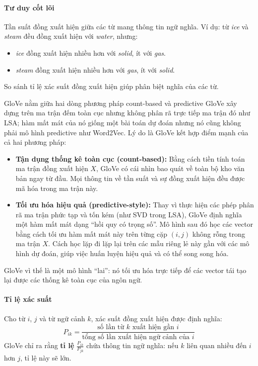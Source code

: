 \paragraph{Tư duy cốt lõi}
Tần suất đồng xuất hiện giữa các từ mang thông tin ngữ nghĩa. Ví dụ: từ \textit{ice} và \textit{steam} đều đồng xuất hiện với \textit{water}, nhưng:
\begin{itemize}
    \item \textit{ice} đồng xuất hiện nhiều hơn với \textit{solid}, ít với \textit{gas}.
    \item \textit{steam} đồng xuất hiện nhiều hơn với \textit{gas}, ít với \textit{solid}.
\end{itemize}
So sánh tỉ lệ xác suất đồng xuất hiện giúp phân biệt nghĩa của các từ.

\begin{assess}{GloVe nằm giữa hai dòng phương pháp count-based và predictive}
GloVe xây dựng trên ma trận đếm toàn cục nhưng không phân rã trực tiếp ma trận đó như LSA; hàm mất mát của nó giống một bài toán dự đoán nhưng nó cũng không phải mô hình predictive như Word2Vec. Lý do là GloVe kết hợp điểm mạnh của cả hai phương pháp:
\begin{itemize}
    \item \textbf{Tận dụng thống kê toàn cục (count-based):} Bằng cách tiền tính toán ma trận đồng xuất hiện $X$, GloVe có cái nhìn bao quát về toàn bộ kho văn bản ngay từ đầu. Mọi thông tin về tần suất và sự đồng xuất hiện đều được mã hóa trong ma trận này.
    \item \textbf{Tối ưu hóa hiệu quả (predictive-style):} Thay vì thực hiện các phép phân rã ma trận phức tạp và tốn kém (như SVD trong LSA), GloVe định nghĩa một hàm mất mát dạng “hồi quy có trọng số”. Mô hình sau đó học các vector bằng cách tối ưu hàm mất mát này trên từng cặp $(i, j)$ không rỗng trong ma trận $X$. Cách học lặp đi lặp lại trên các mẫu riêng lẻ này gần với các mô hình dự đoán, giúp việc huấn luyện hiệu quả và có thể song song hóa.
\end{itemize}
GloVe vì thế là một mô hình “lai”: nó tối ưu hóa trực tiếp để các vector tái tạo lại được các thống kê toàn cục của ngôn ngữ.
\end{assess}

\paragraph{Tỉ lệ xác suất}
Cho từ $i$, $j$ và từ ngữ cảnh $k$, xác suất đồng xuất hiện được định nghĩa:
\[
P_{ik} = \frac{\text{số lần từ $k$ xuất hiện gần $i$}}{\text{tổng số lần xuất hiện ngữ cảnh của $i$}}
\]
GloVe chỉ ra rằng \textbf{tỉ lệ} $\frac{P_{ik}}{P_{jk}}$ chứa thông tin ngữ nghĩa: nếu $k$ liên quan nhiều đến $i$ hơn $j$, tỉ lệ này sẽ lớn.

